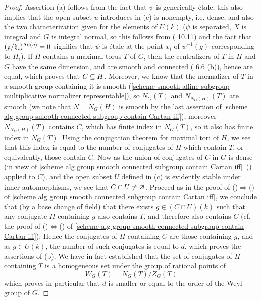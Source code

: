 \begin{proof}
Assertion (a) follows from the fact that $\psi$ is generically \'etale; this also implies that the open subset $u$ introduces in (c) is nonempty, i.e. dense, and also the two characterization given for the elements of $U(k)$ ($\psi$ is separated, $X$ is integral and $G$ is integral normal, so this follows from (\cite{SGA1}  10.11) and the fact that $(\mathfrak{g}/\mathfrak{h}_i)^{\mathrm{Ad}(g)}=0$ signifies that $\psi$ is \'etale at the point $x_i$ of $\psi^{-1}(g)$ corresponding to $H_i$). If $H$ contains a maximal torus $T$ of $G$, then the centralizers of $T$ in $H$ and $G$ have the same dimension, and are smooth and connected (\cite{SGA3-2}  6.6 (b)), hence are equal, which proves that $C\subseteq H$. Moreover, we know that the normalizer of $T$ in a smooth group containing it is smooth (\cref{scheme smooth affine subgroup multiplicative normalizer representable}), so $N_G(T)$ and $N_{N_G(H)}(T)$ are smooth (we note that $N=N_G(H)$ is smooth by the last assertion of \cref{scheme alg group smooth connected subgroup contain Cartan iff}), moreover $N_{N_G(H)}(T)$ contains $C$, which has finite index in $N_G(T)$, so it also has finite index in $N_G(T)$. Using the conjugation theorem for maximal tori of $H$, we see that this index is equal to the number of conjugates of $H$ which contain $T$, or equivalently, those contain $C$. Now as the union of conjugates of $C$ in $G$ is dense (in view of \cref{scheme alg group smooth connected subgroup contain Cartan iff}~() applied to $C$), and the open subset $U$ defined in (c) is evidently stable under inner automorphisms, we see that $C\cap U\neq\varnothing$. Proceed as in the proof of ()$\Rightarrow$() of \cref{scheme alg group smooth connected subgroup contain Cartan iff}, we conclude that (by a base change of field) that there exists $g\in(C\cap U)(k)$ such that any conjugate $H$ containing $g$ also contains $T$, and therefore also contains $C$ (cf. the proof of ()$\Leftrightarrow$() of \cref{scheme alg group smooth connected subgroup contain Cartan iff}). Hence the conjugates of $H$ containing $C$ are those containing $g$, and as $g\in U(k)$, the number of such conjugates is equal to $d$, which proves the assertions of (b). We have in fact established that the set of conjugates of $H$ containing $T$ is a homogeneous set under the group of rational points of
\[W_G(T)=N_G(T)/Z_G(T)\]
which proves in particular that $d$ is smaller or equal to the order of the Weyl group of $G$.
\end{proof}

